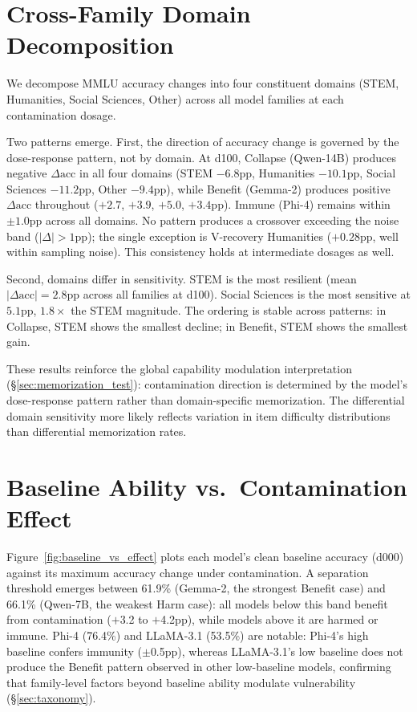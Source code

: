 \section{Cross-Family Domain Decomposition}
\label{sec:domain_decomposition}

We decompose MMLU accuracy changes into four constituent domains (STEM, Humanities, Social Sciences, Other) across all model families at each contamination dosage.

Two patterns emerge. First, the direction of accuracy change is governed by the dose-response pattern, not by domain. At d100, Collapse (Qwen-14B) produces negative $\Delta\text{acc}$ in all four domains (STEM $-6.8$pp, Humanities $-10.1$pp, Social Sciences $-11.2$pp, Other $-9.4$pp), while Benefit (Gemma-2) produces positive $\Delta\text{acc}$ throughout ($+2.7$, $+3.9$, $+5.0$, $+3.4$pp). Immune (Phi-4) remains within $\pm 1.0$pp across all domains. No pattern produces a crossover exceeding the noise band ($|\Delta| > 1$pp); the single exception is V-recovery Humanities ($+0.28$pp, well within sampling noise). This consistency holds at intermediate dosages as well.

Second, domains differ in sensitivity. STEM is the most resilient (mean $|\Delta\text{acc}| = 2.8$pp across all families at d100). Social Sciences is the most sensitive at $5.1$pp, $1.8\times$ the STEM magnitude. The ordering is stable across patterns: in Collapse, STEM shows the smallest decline; in Benefit, STEM shows the smallest gain.

These results reinforce the global capability modulation interpretation (\S\ref{sec:memorization_test}): contamination direction is determined by the model's dose-response pattern rather than domain-specific memorization. The differential domain sensitivity more likely reflects variation in item difficulty distributions than differential memorization rates.

\section{Baseline Ability vs.\ Contamination Effect}
\label{sec:baseline_vs_effect}

Figure~\ref{fig:baseline_vs_effect} plots each model's clean baseline accuracy (d000) against its maximum accuracy change under contamination. A separation threshold emerges between 61.9\% (Gemma-2, the strongest Benefit case) and 66.1\% (Qwen-7B, the weakest Harm case): all models below this band benefit from contamination ($+$3.2 to $+$4.2pp), while models above it are harmed or immune. Phi-4 (76.4\%) and LLaMA-3.1 (53.5\%) are notable: Phi-4's high baseline confers immunity ($\pm$0.5pp), whereas LLaMA-3.1's low baseline does not produce the Benefit pattern observed in other low-baseline models, confirming that family-level factors beyond baseline ability modulate vulnerability (\S\ref{sec:taxonomy}).

